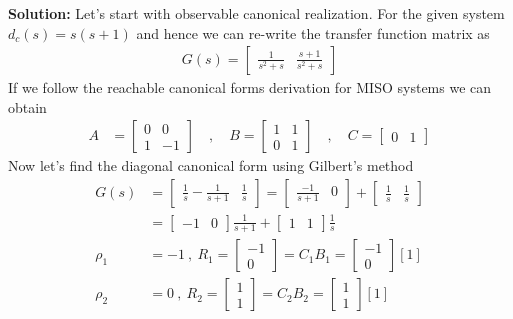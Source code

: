 \documentclass[twoside]{article}
\begin{document}
\textbf{Solution:} Let's start with observable canonical realization. For the given system $d_c(s) = s(s+1)$ and hence we can re-write the 
transfer function matrix as
%
\begin{align*}
	G(s) =  \left[ \begin{array}{cc} \frac{ 1 }{ s^2 + s }  
	       &  \frac{ s+1 }{ s^2 + s}   \end{array} \right] 
\end{align*}
%  
If we follow the reachable canonical forms derivation for MISO systems we can obtain
%
%
\begin{align*}
A &= \left[ \begin{array}{ccc} 0 & 0 \\ 1 & -1  \end{array} \right]
\quad , \quad 
B = \left[ \begin{array}{cc} 1 & 1 \\  0 & 1 \end{array} \right]
\quad , \quad 
	C = \left[ \begin{array}{cc} 0  & 1  \end{array} \right]
\end{align*}
% 
Now let's find the diagonal canonical form using Gilbert's method
\begin{align*}
	G(s) &=  \left[ \begin{array}{cc} \frac{ 1 }{ s }  - \frac{ 1 }{ s + 1 }  &  \frac{ 1 }{ s }  \end{array} \right]  = 
	\left[ \begin{array}{cc} \frac{ -1 }{ s + 1 }  & 0  \end{array} \right]  
	+ \left[ \begin{array}{cc} \frac{ 1 }{ s }  & \frac{ 1 }{ s }  \end{array} \right] 
	\\ &= \left[ \begin{array}{cc} -1 & 0  \end{array} \right] \frac{ 1 }{ s + 1 }  + \left[ \begin{array}{cc} 1 & 1  \end{array} \right] \frac{ 1 }{ s }  
	     \\
	    \rho_1 & = -1 \ , \ R_1 = \left[ \begin{array}{cc} -1
	       \\ 0  \end{array} \right] = C_1 B_1 = \left[ \begin{array}{cc} -1
	       \\ 0  \end{array} \right] [1]
	       \\
	       	     \rho_2 & = 0 \ , \ R_2 = \left[ \begin{array}{cc} 1
	       \\ 1  \end{array} \right] = C_2 B_2 = \left[ \begin{array}{cc} 1
	       \\ 1  \end{array} \right] [1]
\end{align*}
\end{document}
